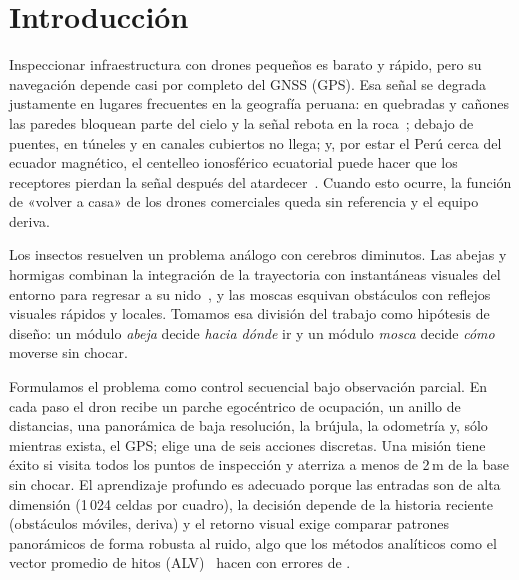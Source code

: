 \section{Introducción}
Inspeccionar infraestructura con drones pequeños es barato y rápido, pero su navegación
depende casi por completo del GNSS (GPS). Esa señal se degrada justamente en lugares
frecuentes en la geografía peruana: en quebradas y cañones las paredes bloquean parte del
cielo y la señal rebota en la roca~\cite{groves2013}; debajo de puentes, en túneles y en
canales cubiertos no llega; y, por estar el Perú cerca del ecuador magnético, el centelleo
ionosférico ecuatorial puede hacer que los receptores pierdan la señal después del
atardecer~\cite{kintner2007}. Cuando esto ocurre, la función de «volver a casa» de los
drones comerciales queda sin referencia y el equipo deriva.

Los insectos resuelven un problema análogo con cerebros diminutos. Las abejas y hormigas
combinan la integración de la trayectoria con instantáneas visuales del entorno para
regresar a su nido~\cite{cartwright1983,wehner2003,srinivasan2011}, y las moscas esquivan
obstáculos con reflejos visuales rápidos y locales. Tomamos esa división del trabajo como
hipótesis de diseño: un módulo \emph{abeja} decide \emph{hacia dónde} ir y un módulo
\emph{mosca} decide \emph{cómo} moverse sin chocar.

Formulamos el problema como control secuencial bajo observación parcial. En cada paso el
dron recibe un parche egocéntrico de ocupación, un anillo de distancias, una panorámica de
baja resolución, la brújula, la odometría y, sólo mientras exista, el GPS; elige una de seis
acciones discretas. Una misión tiene éxito si visita todos los puntos de inspección y aterriza
a menos de 2\,m de la base sin chocar. El aprendizaje profundo es adecuado porque las
entradas son de alta dimensión (1\,024 celdas por cuadro), la decisión depende de la historia
reciente (obstáculos móviles, deriva) y el retorno visual exige comparar patrones
panorámicos de forma robusta al ruido, algo que los métodos analíticos como el vector
promedio de hitos (ALV)~\cite{lambrinos2000} hacen con errores de \nfbAlvErrorMediano{}.


